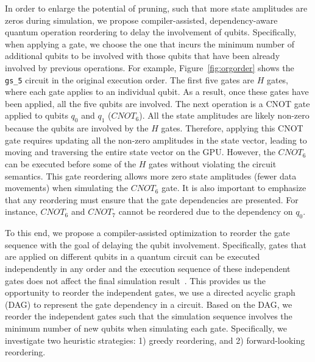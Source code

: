 \noindent  
In order to enlarge the potential of pruning, such that more state amplitudes are zeros during simulation, we propose compiler-assisted, dependency-aware quantum operation reordering to delay the involvement of qubits. 
Specifically, when applying a gate, we choose the one that incurs the minimum number of additional qubits to be involved with those qubits that have been already involved by previous operations. 
For example, Figure~\ref{fig:orgorder} shows the {\tt gs\_5} circuit in the original execution order. The first five gates are $H$ gates, where each gate applies to an individual qubit. As a result, once these gates have been applied, all the five qubits are involved.
The next operation is a CNOT gate applied to qubits $q_{0}$ and $q_{1}$ ($CNOT_{6}$). All the state amplitudes are likely non-zero because the qubits are involved by the $H$ gates. Therefore, applying this CNOT gate requires updating all the non-zero amplitudes in the state vector, leading to moving and traversing the entire state vector on the GPU. However, the $CNOT_{6}$ can be executed before some of the $H$ gates without violating the circuit semantics. This gate reordering allows more zero state amplitudes (fewer data movements) when simulating the $CNOT_{6}$ gate. 
It is also important to emphasize that any reordering must ensure that the gate dependencies are presented. For instance, $CNOT_{6}$ and $CNOT_{7}$ cannot be reordered due to the dependency on $q_0$.

To this end, we propose a compiler-assisted optimization to reorder the gate sequence with the goal of delaying the qubit involvement. Specifically, gates that are applied on different qubits in a quantum circuit can be executed independently in any order and the execution sequence of these independent gates does not affect the final simulation result~\cite{10.1145/3297858.3304023,10.1109/HPCA51647.2021.00026,10.1145/3498325}. This provides us the opportunity to reorder the independent gates, we use a directed acyclic graph (DAG) to represent the gate dependency in a circuit. Based on the DAG, we reorder the independent gates such that the simulation sequence involves the minimum number of new qubits when simulating each gate. Specifically, we investigate two heuristic strategies: 1) greedy reordering, and 2) forward-looking reordering.

